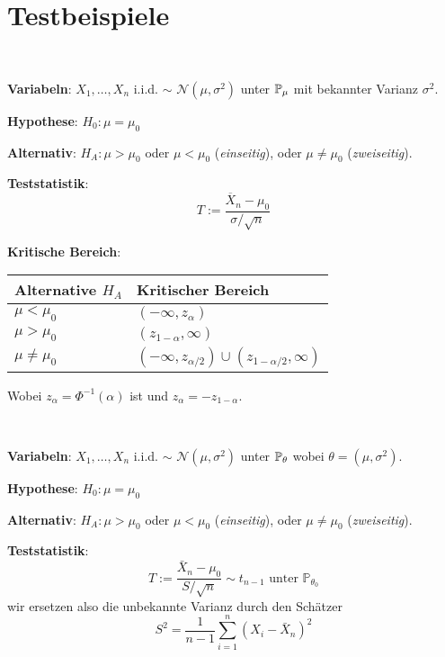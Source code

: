\section*{Testbeispiele}
 \\

\textbf{Variabeln}: $X_1, \ldots , X_n$ i.i.d. $\sim$ $\mathcal{N}(\mu, \sigma^2)$ unter $\mathbb{P}_\mu$ mit bekannter Varianz $\sigma^2$.

\textbf{Hypothese}: $H_0 : \mu = \mu_0$

\textbf{Alternativ}: $H_A : \mu > \mu_0$ oder $\mu < \mu_0$ (\textit{einseitig}), oder $\mu \neq \mu_0$ (\textit{zweiseitig}).

\textbf{Teststatistik}: $$T := \frac{\overline{X}_n - \mu_0}{\sigma / \sqrt{n}}$$

\textbf{Kritische Bereich}: \renewcommand\arraystretch{1.8}
\begin{center}
    \begin{tabular}{l|l}
  		Alternative $H_A$ & Kritischer Bereich \\
  		\hline
  		$\mu < \mu_0 $ & $(-\infty, z_\alpha)$ \\
  		\hline
  		$\mu > \mu_0$ & $(z_{1-\alpha}, \infty)$ \\
  		\hline
  		$\mu \neq \mu_0$ & $(-\infty, z_{\alpha/2}) \cup (z_{1-\alpha/2}, \infty)$ 
	\end{tabular}
\end{center}
\renewcommand{\arraystretch}{1}
Wobei $z_\alpha = \Phi^{-1}(\alpha)$ ist und $z_\alpha = -z_{1-\alpha}$.

 \\

\textbf{Variabeln}: $X_1, \ldots , X_n$ i.i.d. $\sim$ $\mathcal{N}(\mu, \sigma^2)$ unter $\mathbb{P}_\theta$ wobei $\theta = (\mu, \sigma^2)$.

\textbf{Hypothese}: $H_0 : \mu = \mu_0$

\textbf{Alternativ}: $H_A : \mu > \mu_0$ oder $\mu < \mu_0$ (\textit{einseitig}), oder $\mu \neq \mu_0$ (\textit{zweiseitig}).

\textbf{Teststatistik}:
$$
T:=\frac{\bar{X}_{n}-\mu_{0}}{S / \sqrt{n}} \sim t_{n-1} \text { unter } \mathbb{P}_{\theta_{0}}
$$
wir ersetzen also die unbekannte Varianz durch den Schätzer
$$
S^{2}=\frac{1}{n-1} \sum_{i=1}^{n}\left(X_{i}-\bar{X}_{n}\right)^{2}
$$

